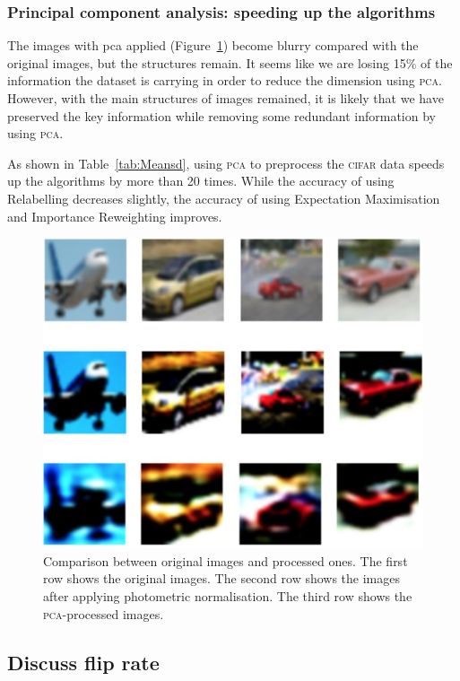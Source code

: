 \documentclass[12pt]{article} %
\begin{document}
\subsubsection{Principal component analysis: speeding up the algorithms}
The images with pca applied (Figure~\ref{fig:Compare_Image}) become blurry compared with the original images, but the structures remain.
It seems like we are losing 15\% of the information the dataset is carrying in order to reduce the dimension using \textsc{pca}. 
However, with the main structures of images remained, it is likely that we have preserved the key information while removing some redundant information by using \textsc{pca}.

As shown in Table~\ref{tab:Meansd}, using \textsc{pca} to preprocess the \textsc{cifar} data speeds up the algorithms by more than 20 times. 
While the accuracy of using Relabelling decreases slightly, the accuracy of using Expectation Maximisation and Importance Reweighting improves. 

\begin{figure} 
    \centering
	\includegraphics[scale=0.6]{img}
	\caption{Comparison between original images and processed ones. The first row shows the original images. The second row shows the images after applying photometric normalisation. The third row shows the \textsc{pca}-processed images.}
	\label{fig:Compare_Image}
\end{figure}




\subsection{Discuss flip rate}
\end{document}
